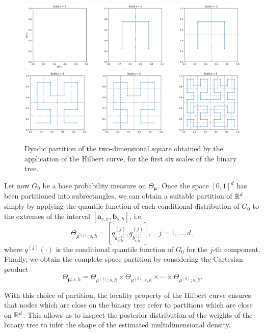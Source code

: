 \documentclass[nonatbib]{elsarticle}
\begin{document}
\begin{figure}[htbp]
    \centering
    \includegraphics[trim={0 0 0 0}, clip, width=\textwidth]{figures/partition_2d_top2.png}
    \includegraphics[trim={0 0 0 0}, clip, width=\textwidth]{figures/partition_2d_bot2.png}
    \caption{Dyadic partition of the two-dimensional square obtained by the application of the Hilbert curve, for the first six scales of the binary tree. 
    }
    \label{fig:partition-2d}
\end{figure}

Let now $G_0$ be a base probability measure on $\Theta_{\bm{\mu}}$.
Once the space $[0,1]^{d}$ has been partitioned into subrectangles, we can obtain a suitable partition of $\mathbb{R}^{d}$ simply by applying the quantile function of each conditional distribution of $G_0$ to the extremes of the interval $[\bm{a}_{s,h}, \bm{b}_{s,h}]$, i.e.
\begin{equation}
    \label{eq:ThetaQuantiles}
    \Theta_{\mu^{(j)};s,h} = [q^{(j)}_{a^{(j)}_{s,h}}, q^{(j)}_{b^{(j)}_{s, h}}], \quad j = 1, \ldots, d,
\end{equation}
where $q^{(j)}(\cdot )$ is the conditional quantile function of $G_0$ for the $j$-th component.
Finally, we obtain the complete space partition by considering the Cartesian product
\[
    \Theta_{\bm{\mu}; s,h} = \Theta_{\mu^{(1)}; s,h}\times \Theta_{\mu^{(2)}; s,h} \times  \cdots \times \Theta_{\mu^{(d)}; s,h}.
\]

With this choice of partition, the locality property of the Hilbert curve ensures that nodes which are close on the binary tree refer to partitions which are close on $\mathbb{R}^{d}$.
This allows us to inspect the posterior distribution of the weights of the binary tree to infer the shape of the estimated multidimensional density.
\end{document}
